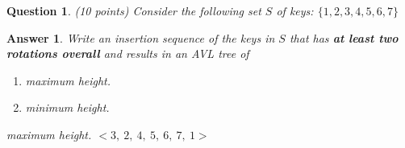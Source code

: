 \documentclass[a4paper]{article}
\theoremstyle{remarksStyle}
\theoremstyle{questionStyle}
\newtheorem{question}{Question}
\theoremstyle{answerStyle}
\newtheorem{answer}{Answer}
\begin{document}
\begin{question} (10 points)
Consider the following set $S$ of keys: $\{ 1,2,3,4,5,6,7 \} $
\end{question}
\begin{answer}
     Write an insertion sequence of the keys in $S$ that has \textbf{at least two rotations overall} and results in an AVL tree of  
         \begin{enumerate}
             \item[(i)] maximum height.
              \item[(ii)]  minimum height.
           \end{enumerate}


    \item[(i)] maximum height.
    $< 3, \ 2, \ 4, \ 5, \ 6, \ 7,\ 1>$


\end{answer}
\end{document}
